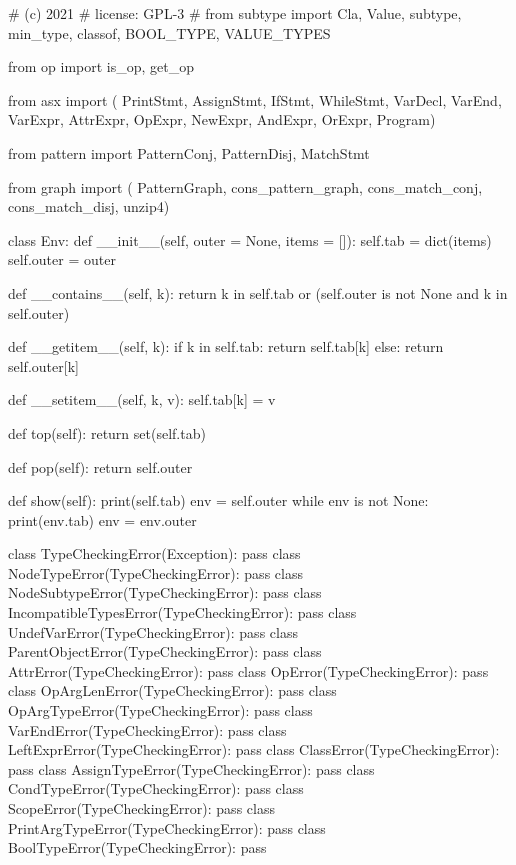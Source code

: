 \begin{dispPy}
#    (c) 2021 
#    license:          GPL-3
#
from subtype import Cla, Value, subtype, min_type, classof, BOOL_TYPE, VALUE_TYPES

from op import is_op, get_op

from asx import (
    PrintStmt,  AssignStmt, IfStmt,     WhileStmt,  VarDecl,
    VarEnd,     VarExpr,    AttrExpr,   OpExpr,     NewExpr,
    AndExpr,    OrExpr,     Program)

from pattern import PatternConj, PatternDisj, MatchStmt

from graph import (
    PatternGraph, cons_pattern_graph, cons_match_conj,
    cons_match_disj, unzip4)

class Env:
    def __init__(self, outer = None, items = []):
        self.tab = dict(items)
        self.outer = outer

    def __contains__(self, k):
        return k in self.tab or (self.outer is not None and k in self.outer)

    def __getitem__(self, k):
        if k in self.tab:
            return self.tab[k]
        else:
            return self.outer[k]

    def __setitem__(self, k, v):
        self.tab[k] = v

    def top(self):
        return set(self.tab)

    def pop(self):
        return self.outer

    def show(self):
        print(self.tab)
        env = self.outer
        while env is not None:
            print(env.tab)
            env = env.outer

class TypeCheckingError(Exception): pass
class NodeTypeError(TypeCheckingError): pass
class NodeSubtypeError(TypeCheckingError): pass
class IncompatibleTypesError(TypeCheckingError): pass
class UndefVarError(TypeCheckingError): pass
class ParentObjectError(TypeCheckingError): pass
class AttrError(TypeCheckingError): pass
class OpError(TypeCheckingError): pass
class OpArgLenError(TypeCheckingError): pass
class OpArgTypeError(TypeCheckingError): pass
class VarEndError(TypeCheckingError): pass
class LeftExprError(TypeCheckingError): pass
class ClassError(TypeCheckingError): pass
class AssignTypeError(TypeCheckingError): pass
class CondTypeError(TypeCheckingError): pass
class ScopeError(TypeCheckingError): pass
class PrintArgTypeError(TypeCheckingError): pass
class BoolTypeError(TypeCheckingError): pass


\end{dispPy}
